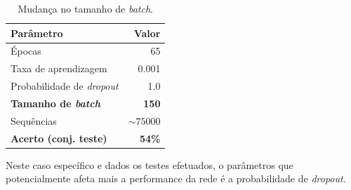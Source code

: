 \begin{table}[H]
\centering
\begin{tabular}{|l|r|}
\hline
\textbf{Parâmetro} & \textbf{Valor}\\
\hline
\hline
Épocas & 65  \\
\hline
Taxa de aprendizagem & 0.001  \\
\hline
Probabilidade de \textit{dropout} & 1.0  \\
\hline
\textbf{Tamanho de \textit{batch}} & \textbf{150}  \\
\hline
Sequências & $\sim75000$  \\
\hline
\hline
\textbf{Acerto (conj. teste)} & \textbf{54\%}\\
\hline
\end{tabular}
\caption{Mudança no tamanho de \textit{batch}.}
\label{tab:size}
\end{table}

\noindent Neste caso específico e dados os testes efetuados, o parâmetros que potencialmente afeta mais a performance da rede é a probabilidade de \textit{dropout}.